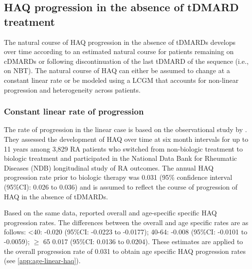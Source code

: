 \documentclass[11pt,final,fleqn]{article}
\theoremstyle{plain}
\begin{document}
\subsection{HAQ progression in the absence of tDMARD treatment}\label{haq-progression-in-the-absence-of-tDMARD-treatment}

The natural course of HAQ progression in the absence of tDMARDs develops over time according to an estimated natural course for patients remaining on cDMARDs or following discontinuation of the last tDMARD of the sequence (i.e., on NBT). The natural course of HAQ can either be assumed to change at a constant linear rate or be modeled using a LCGM that accounts for non-linear progression and heterogeneity across patients. 

\subsubsection{Constant linear rate of progression} \label{sec:haq-linear-rate}
The rate of progression in the linear case is based on the observational study by \citet{wolfe2010loss}. They assessed the development of HAQ over time at six month intervals for up to 11 years among 3,829 RA patients who switched from non-biologic treatment to biologic treatment and participated in the National Data Bank for Rheumatic Diseases (NDB) longitudinal study of RA outcomes. The annual HAQ progression rate prior to biologic therapy was 0.031 (95\% confidence interval (95\%CI): 0.026 to 0.036) and is assumed to reflect the course of progression of HAQ in the absence of tDMARDs.

Based on the same data, \citet{michaud2011treatment} reported overall and age-specific specific HAQ progression rates. The differences between the overall and age specific rates are as follows: \textless{}40: -0.020 (95\%CI: -0.0223 to -0.0177); 40-64: -0.008 (95\%CI: -0.0101 to -0.0059); \(\geq\) 65 0.017 (95\%CI: 0.0136 to 0.0204). These estimates are applied to the overall progression rate of 0.031 to obtain age specific HAQ progression rates (see \autoref{app:age-linear-haq}).
\end{document}

